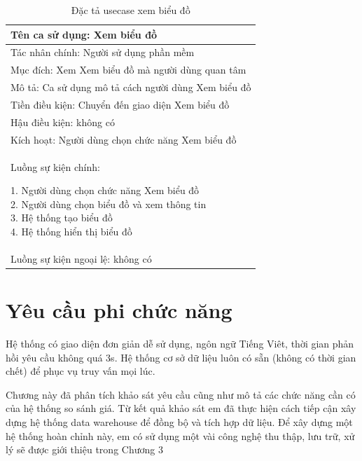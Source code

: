 \documentclass[../DoAn.tex]{subfiles}
\begin{document}
\begin{table}[H]
\centering{}
    \begin{tabular}{|l|}
    \hline
    Tên ca sử dụng: Xem biểu đồ \\
    \hline
    Tác nhân chính: Người sử dụng phần mềm\\
    \hline
    Mục đích: Xem Xem biểu đồ  mà người dùng quan tâm\\
    \hline
    Mô tả: Ca sử dụng mô tả cách người dùng Xem biểu đồ \\
    \hline
    Tiền điều kiện: Chuyển đến giao diện Xem biểu đồ \\
    \hline
    Hậu điều kiện: không có\\
    \hline
    Kích hoạt: Người dùng chọn chức năng Xem biểu đồ \\
    \hline
    \makecell{Luồng sự kiện chính: \\
    
    1. Người dùng chọn chức năng Xem biểu đồ 
    \\
    2. Người dùng chọn biểu đồ và xem thông tin
    \\
    3. Hệ thống tạo biểu đồ
    \\
    4. Hệ thống hiển thị biểu đồ }
    \\
    \hline
    Luồng sự kiện ngoại lệ: không có
    \\
    \hline
    \end{tabular}
    \caption{Đặc tả usecase xem biểu đồ}
    \label{fig:my_label}
\end{table}


\section{Yêu cầu phi chức năng}
\label{section:2.4}
Hệ thống có giao diện đơn giản dễ sử dụng, ngôn ngữ Tiếng Viêt, thời gian phản hồi yêu cầu không quá 3s. Hệ thống cơ sở dữ liệu luôn có sẵn (không có thời gian chết) để phục vụ truy vấn mọi lúc.

Chương này đã phân tích khảo sát yêu cầu cũng như mô tả các chức năng cần có của hệ thống so sánh giá. Từ kết quả khảo sát em đã thực hiện cách tiếp cận xây dựng hệ thống data warehouse để đồng bộ và tích hợp dữ liệu. Để xây dựng một hệ thống hoàn chỉnh này, em có sử dụng một vài công nghệ thu thập, lưu trữ, xử lý sẽ được giới thiệu trong Chương 3
\end{document}
